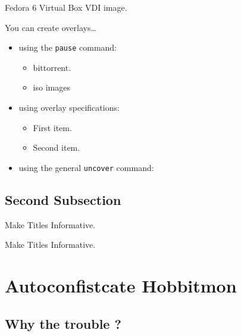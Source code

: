 \documentclass{beamer}
\begin{document}
\begin{frame}{Fedora 6  Virtual Box VDI image.}

  You can create overlays\dots
  \begin{itemize}
  \item using the \texttt{pause} command:
    \begin{itemize}
    \item
      bittorrent.
      \pause
    \item    
      iso images
    \end{itemize}
  \item
    using overlay specifications:
    \begin{itemize}
    \item<3->
      First item.
    \item<4->
      Second item.
    \end{itemize}
  \item
    using the general \texttt{uncover} command:
    \begin{itemize}
    \end{itemize}
  \end{itemize}
\end{frame}


\subsection{Second Subsection}

\begin{frame}{Make Titles Informative.}
\end{frame}

\begin{frame}{Make Titles Informative.}
\end{frame}



\section{Autoconfistcate Hobbitmon}
\subsection[Why the trouble ? ]{Why the trouble ?}
\end{document}
